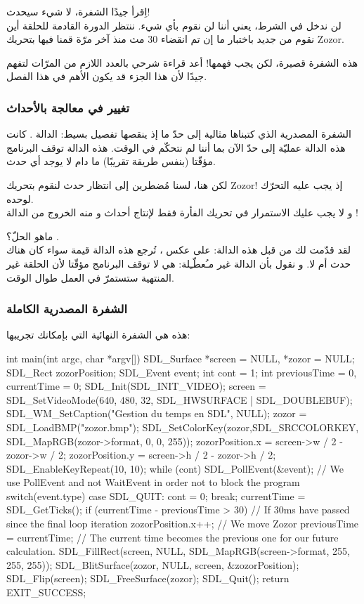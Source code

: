 اِقرأ جيدًا الشفرة، لا شيء سيحدث!\\
لن ندخل في الشرط، يعني أننا لن نقوم بأي شيء. ننتظر الدورة القادمة للحلقة أين نقوم من جديد باختبار ما إن تم انقضاء 30 مث منذ آخر مرّة قمنا فيها بتحريك 
\textenglish{Zozor}.

هذه الشفرة قصيرة، لكن يجب فهمها! أعد قراءة شرحي بالعدد اللازم من المرّات لتفهم جيدًا لأن هذا الجزء قد يكون الأهم في هذا الفصل.

\subsubsection{تغيير في معالجة بالأحداث}

الشفرة المصدرية الذي كتبناها مثالية إلى حدّ ما إذ ينقصها تفصيل بسيط: الدالة 
.
كانت هذه الدالة عمليّة إلى حدّ الآن بما أننا لم نتحكّم في الوقت. هذه الدالة توقف البرنامج مؤقّتا (بنفس طريقة
تقريبًا) ما دام لا يوجد أي حدث.

لكن هنا، لسنا مُضطرين إلى انتظار حدث لنقوم بتحريك
\textenglish{Zozor}!
إذ يجب عليه التحرّك لوحده.\\
و لا يجب عليك الاستمرار في تحريك الفأرة فقط لإنتاج أحداث و منه الخروج من الدالة 
!

ماهو الحلّ؟ 
.\\
لقد قدّمت لك من قبل هذه الدالة: على عكس
،
تُرجع هذه الدالة قيمة سواء كان هناك حدث أم لا. و نقول بأن الدالة غير مـُعطّـِلة: هي لا توقف البرنامج مؤقّتا لأن الحلقة غير المنتهية ستستمرّ في العمل طوال الوقت.

\subsubsection{الشفرة المصدرية الكاملة}

هذه هي الشفرة النهائية التي بإمكانك تجريبها:

\begin{Csource}
int main(int argc, char *argv[])
{
	SDL_Surface *screen = NULL, *zozor = NULL;
	SDL_Rect zozorPosition;
	SDL_Event event;
	int cont = 1;
	int previousTime = 0, currentTime = 0;
	SDL_Init(SDL_INIT_VIDEO);
	screen = SDL_SetVideoMode(640, 480, 32, SDL_HWSURFACE | SDL_DOUBLEBUF);
	SDL_WM_SetCaption("Gestion du temps en SDL", NULL);
	zozor = SDL_LoadBMP("zozor.bmp");
	SDL_SetColorKey(zozor,SDL_SRCCOLORKEY, SDL_MapRGB(zozor->format, 0, 0, 255));
	zozorPosition.x = screen->w / 2 - zozor->w / 2;
	zozorPosition.y = screen->h / 2 - zozor->h / 2;
	SDL_EnableKeyRepeat(10, 10);
	while (cont)
	{
		SDL_PollEvent(&event); // We use PollEvent and not WaitEvent in order not to block the program
		switch(event.type)
		{
			case SDL_QUIT:
			cont = 0;
			break;
		}
		currentTime = SDL_GetTicks();
		if (currentTime - previousTime > 30) // If 30ms have passed since the final loop iteration
		{
			zozorPosition.x++; // We move Zozor
			previousTime = currentTime; // The current time becomes the previous one for our future calculation.
		}
		SDL_FillRect(screen, NULL, SDL_MapRGB(screen->format, 255, 255, 255));
		SDL_BlitSurface(zozor, NULL, screen, &zozorPosition);
		SDL_Flip(screen);
	}
	SDL_FreeSurface(zozor);
	SDL_Quit();
	return EXIT_SUCCESS;
}
\end{Csource}


